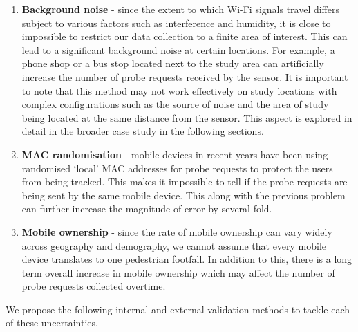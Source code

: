 \begin{enumerate} 
  \item \textbf{Background noise} - since the extent to which Wi-Fi signals travel differs subject to various factors such as interference and humidity, it is close to impossible to restrict our data collection to a finite area of interest.
  This can lead to a significant background noise at certain locations.
  For example, a phone shop or a bus stop located next to the study area can artificially increase the number of probe requests received by the sensor.
  It is important to note that this method may not work effectively on study locations with complex configurations such as the source of noise and the area of study being located at the same distance from the sensor.
  This aspect is explored in detail in the broader case study in the following sections.
  \item \textbf{MAC randomisation} - mobile devices in recent years have been using randomised `local' MAC addresses for probe requests to protect the users from being tracked.
  This makes it impossible to tell if the probe requests are being sent by the same mobile device. This along with the previous problem can further increase the magnitude of error by several fold.
  \item \textbf{Mobile ownership} - since the rate of mobile ownership can vary widely across geography and demography, we cannot assume that every mobile device translates to one pedestrian footfall.
  In addition to this, there is a long term overall increase in mobile ownership which may affect the number of probe requests collected overtime.
\end{enumerate}

We propose the following internal and external validation methods to tackle each of these uncertainties.


